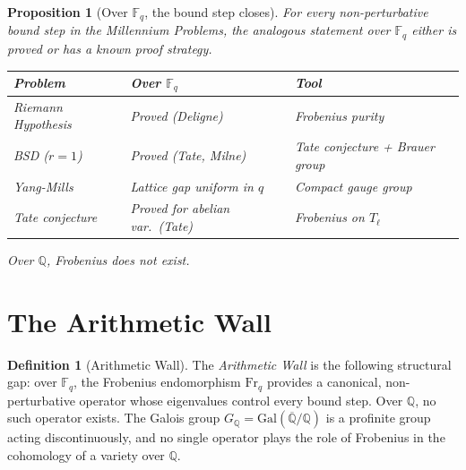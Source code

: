 \documentclass[12pt]{article}
\newtheorem{proposition}[theorem]{Proposition}
\theoremstyle{definition}
\newtheorem{definition}[theorem]{Definition}
\theoremstyle{remark}
\begin{document}
\begin{proposition}[Over $\mathbb{F}_q$, the bound step closes]\label{prop:fq}
For every non-perturbative bound step in the Millennium Problems,
the analogous statement over $\mathbb{F}_q$ either is proved or has a
known proof strategy.
\begin{center}
\begin{tabular}{@{}lll@{}}
\toprule
Problem & Over $\mathbb{F}_q$ & Tool \\
\midrule
Riemann Hypothesis & Proved (Deligne) & Frobenius purity \\
BSD ($r=1$) & Proved (Tate, Milne) & Tate conjecture + Brauer group \\
Yang-Mills & Lattice gap uniform in $q$ & Compact gauge group \\
Tate conjecture & Proved for abelian var.\ (Tate) & Frobenius on $T_\ell$ \\
\bottomrule
\end{tabular}
\end{center}
Over $\mathbb{Q}$, Frobenius does not exist.
\end{proposition}

\section{The Arithmetic Wall}

\begin{definition}[Arithmetic Wall]
The \emph{Arithmetic Wall} is the following structural gap:
over $\mathbb{F}_q$, the Frobenius endomorphism $\mathrm{Fr}_q$ provides
a canonical, non-perturbative operator whose eigenvalues control every
bound step. Over $\mathbb{Q}$, no such operator exists. The Galois group
$G_\mathbb{Q} = \mathrm{Gal}(\overline{\mathbb{Q}}/\mathbb{Q})$ is a
profinite group acting discontinuously, and no single operator plays
the role of Frobenius in the cohomology of a variety over $\mathbb{Q}$.
\end{definition}
\end{document}
